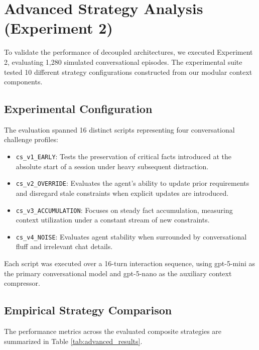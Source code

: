 \documentclass[11pt,journal,onecolumn]{article}
\begin{document}
\section{Advanced Strategy Analysis (Experiment 2)}
To validate the performance of decoupled architectures, we executed Experiment 2, evaluating 1,280 simulated conversational episodes. The experimental suite tested 10 different strategy configurations constructed from our modular context components.

\subsection{Experimental Configuration}
The evaluation spanned 16 distinct scripts representing four conversational challenge profiles:
\begin{itemize}
    \item \texttt{cs\_v1\_EARLY}: Tests the preservation of critical facts introduced at the absolute start of a session under heavy subsequent distraction.
    \item \texttt{cs\_v2\_OVERRIDE}: Evaluates the agent's ability to update prior requirements and disregard stale constraints when explicit updates are introduced.
    \item \texttt{cs\_v3\_ACCUMULATION}: Focuses on steady fact accumulation, measuring context utilization under a constant stream of new constraints.
    \item \texttt{cs\_v4\_NOISE}: Evaluates agent stability when surrounded by conversational fluff and irrelevant chat details.
\end{itemize}

Each script was executed over a 16-turn interaction sequence, using gpt-5-mini as the primary conversational model and gpt-5-nano as the auxiliary context compressor.

\subsection{Empirical Strategy Comparison}
The performance metrics across the evaluated composite strategies are summarized in Table \ref{tab:advanced_results}.
\end{document}
